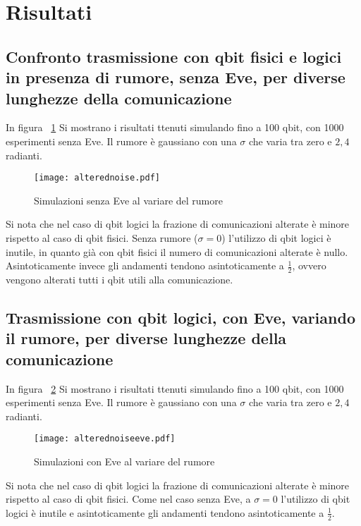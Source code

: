 \documentclass[11 pt, a4paper]{article}
\begin{document}
\clearpage
\section{Risultati}
\subsection{Confronto trasmissione con qbit fisici e logici in presenza di rumore, senza Eve, per diverse lunghezze della comunicazione}

In figura ~\ref{fig:alteredvsnoise} Si mostrano i risultati ttenuti simulando fino a 100 qbit, con 1000 esperimenti senza Eve.
Il rumore è gaussiano con una $\sigma$ che varia tra zero e $2,4$ radianti.

\begin{figure}[htb!]
\centering
\texttt{[image: alterednoise.pdf]}
\caption{Simulazioni senza Eve al variare del rumore}
\label{fig:alteredvsnoise}
\end{figure}

Si nota che nel caso di qbit logici la frazione di comunicazioni alterate è minore rispetto al caso di qbit fisici.
Senza rumore ($\sigma=0$) l'utilizzo di qbit logici è inutile, in quanto già con qbit fisici il numero di comunicazioni alterate è nullo.
Asintoticamente invece gli andamenti tendono asintoticamente a $\frac{1}{2}$, ovvero vengono alterati tutti i qbit utili alla comunicazione.

\subsection{Trasmissione con qbit logici, con Eve, variando il rumore, per diverse lunghezze della comunicazione}

In figura ~\ref{fig:alteredvsnoiseeve} Si mostrano i risultati ttenuti simulando fino a 100 qbit, con 1000 esperimenti senza Eve.
Il rumore è gaussiano con una $\sigma$ che varia tra zero e $2,4$ radianti.

\begin{figure}[htb!]
\centering
\texttt{[image: alterednoiseeve.pdf]}
\caption{Simulazioni con Eve al variare del rumore}
\label{fig:alteredvsnoiseeve}
\end{figure}

Si nota che nel caso di qbit logici la frazione di comunicazioni alterate è minore rispetto al caso di qbit fisici.
Come nel caso senza Eve, a $\sigma=0$ l'utilizzo di qbit logici è inutile e asintoticamente gli andamenti tendono asintoticamente a $\frac{1}{2}$.
\end{document}
